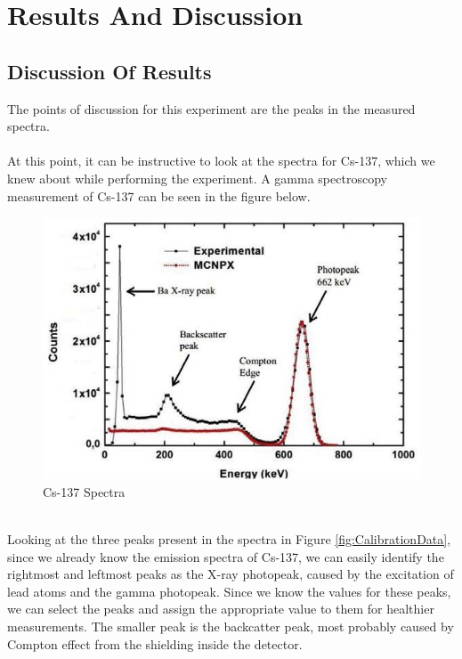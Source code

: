 \section{Results And Discussion}

	\subsection{Discussion Of Results}
	
	The points of discussion for this experiment are the peaks in the measured spectra. 
	\\
	\\
	At this point, it can be instructive to look at the spectra for Cs-137, which we knew about while performing the experiment. A gamma spectroscopy measurement of Cs-137 can be seen in the figure below.
	\begin{figure}[h]
		\caption{Cs-137 Spectra}
		\centering
		\includegraphics[width=\textwidth]{images/cs137_spectra.png}
	\end{figure}
	\\
	Looking at the three peaks present in the spectra in Figure \ref{fig:CalibrationData}, since we already know the emission spectra of Cs-137, we can easily identify the rightmost and leftmost peaks as the X-ray photopeak, caused by the excitation of lead atoms and the gamma photopeak. Since we know the values for these peaks, we can select the peaks and assign the appropriate value to them for healthier measurements. The smaller peak is the backcatter peak, most probably caused by Compton effect from the shielding inside the detector.
	\\
	\\
